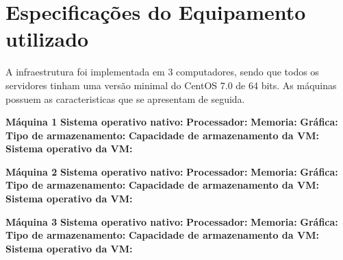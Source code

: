 \section{Especificações do Equipamento utilizado}
A infraestrutura foi implementada em 3 computadores, sendo que todos os servidores tinham uma versão minimal do CentOS 7.0 de 64 bits. As máquinas possuem as caracteristicas que se apresentam de seguida.

\textbf{Máquina 1}
\textbf{Sistema operativo nativo:} \textit{}
\textbf{Processador:} \textit{}
\textbf{Memoria:} \textit{}
\textbf{Gráfica:} \textit{}
\textbf{Tipo de armazenamento:} \textit{}
\textbf{Capacidade de armazenamento da VM:} \textit{}
\textbf{Sistema operativo da VM:} \textit{}

\textbf{Máquina 2}
\textbf{Sistema operativo nativo:} \textit{}
\textbf{Processador:} \textit{}
\textbf{Memoria:} \textit{}
\textbf{Gráfica:} \textit{}
\textbf{Tipo de armazenamento:} \textit{}
\textbf{Capacidade de armazenamento da VM:} \textit{}
\textbf{Sistema operativo da VM:} \textit{}

\textbf{Máquina 3}
\textbf{Sistema operativo nativo:} \textit{}
\textbf{Processador:} \textit{}
\textbf{Memoria:} \textit{}
\textbf{Gráfica:} \textit{}
\textbf{Tipo de armazenamento:} \textit{}
\textbf{Capacidade de armazenamento da VM:} \textit{}
\textbf{Sistema operativo da VM:} \textit{}
